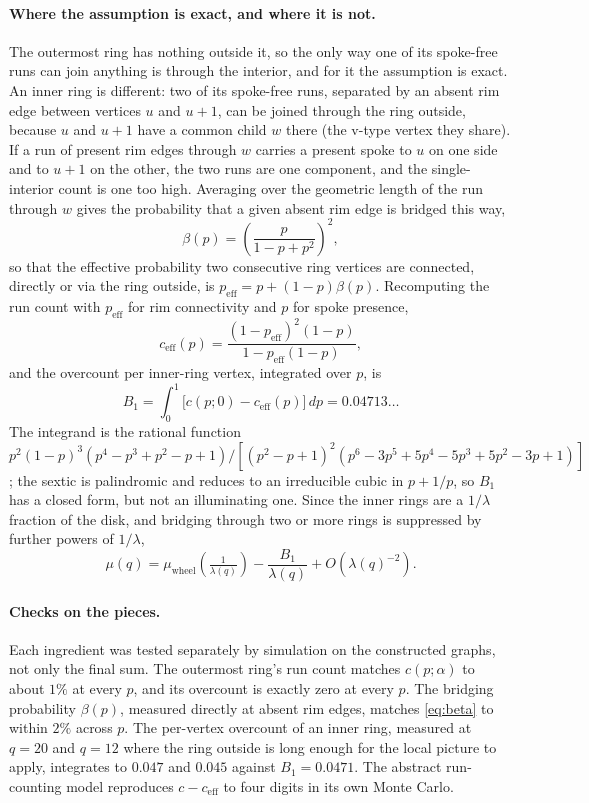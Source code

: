 \documentclass[11pt]{article}
\begin{document}
\paragraph{Where the assumption is exact, and where it is not.} The outermost ring has nothing outside it, so the only way one of its spoke-free runs can join anything is through the interior, and for it the assumption is exact. An inner ring is different: two of its spoke-free runs, separated by an absent rim edge between vertices $u$ and $u+1$, can be joined through the ring outside, because $u$ and $u+1$ have a common child $w$ there (the v-type vertex they share). If a run of present rim edges through $w$ carries a present spoke to $u$ on one side and to $u+1$ on the other, the two runs are one component, and the single-interior count is one too high. Averaging over the geometric length of the run through $w$ gives the probability that a given absent rim edge is bridged this way,
\begin{equation}
\beta(p) = \left(\frac{p}{1-p+p^2}\right)^2,
\label{eq:beta}
\end{equation}
so that the effective probability two consecutive ring vertices are connected, directly or via the ring outside, is $p_{\mathrm{eff}}=p+(1-p)\beta(p)$. Recomputing the run count with $p_{\mathrm{eff}}$ for rim connectivity and $p$ for spoke presence,
\[
c_{\mathrm{eff}}(p) = \frac{(1-p_{\mathrm{eff}})^2(1-p)}{1-p_{\mathrm{eff}}(1-p)},
\]
and the overcount per inner-ring vertex, integrated over $p$, is
\begin{equation}
B_1 = \int_0^1\big[c(p;0)-c_{\mathrm{eff}}(p)\big]\,dp = 0.04713\ldots
\label{eq:B1}
\end{equation}
The integrand is the rational function $p^2(1-p)^3(p^4-p^3+p^2-p+1)/[(p^2-p+1)^2(p^6-3p^5+5p^4-5p^3+5p^2-3p+1)]$; the sextic is palindromic and reduces to an irreducible cubic in $p+1/p$, so $B_1$ has a closed form, but not an illuminating one. Since the inner rings are a $1/\lambda$ fraction of the disk, and bridging through two or more rings is suppressed by further powers of $1/\lambda$,
\begin{equation}
\mu(q) = \mu_{\mathrm{wheel}}\!\left(\tfrac{1}{\lambda(q)}\right) - \frac{B_1}{\lambda(q)} + O\!\left(\lambda(q)^{-2}\right).
\label{eq:mu-derived}
\end{equation}

\paragraph{Checks on the pieces.} Each ingredient was tested separately by simulation on the constructed graphs, not only the final sum. The outermost ring's run count matches $c(p;\alpha)$ to about $1\%$ at every $p$, and its overcount is exactly zero at every $p$. The bridging probability $\beta(p)$, measured directly at absent rim edges, matches \eqref{eq:beta} to within $2\%$ across $p$. The per-vertex overcount of an inner ring, measured at $q=20$ and $q=12$ where the ring outside is long enough for the local picture to apply, integrates to $0.047$ and $0.045$ against $B_1=0.0471$. The abstract run-counting model reproduces $c-c_{\mathrm{eff}}$ to four digits in its own Monte Carlo.
\end{document}
